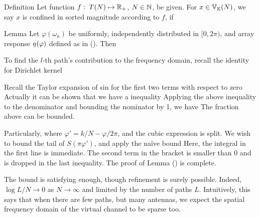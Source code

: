 \Result
{Definition}
{
Let function \(f:\; T (N) \mapsto \mathbb{R}_+\), \(N \in \mathbb{N}\), be given.
For \(x \in \mathbb{V}_{\mathbb{K}}(N)\), we say \(x\) is confined in sorted magnitude according to \(f\), if
}

\Result
{Lemma}
{
Let \(\varphi (\omega_h)\) be uniformly, independently distributed in \([0,2\pi)\), and array response \(\V{a} (\varphi)\) defined as in ().
Then
%
%
}

To find the \(l\)-th path's contribution to the frequency domain, recall the identity for Dirichlet kernel
%
%

Recall the Taylor expansion of sin for the first two terms with respect to zero
%
%
Actually it can be shown that we have a inequality
%
%
Applying the above inequality to the denominator and bounding the nominator by 1, we have
%
%
The fraction above can be bounded.

Particularly,
%
%
where \(\varphi' =k/N -\varphi/2\pi\), and the cubic expression is split.
We wish to bound the tail of \(S (\pi \varphi')\), and apply the na\"ive bound
%
%
Here, the integral in the first line is immediate.
The second term in the bracket is smaller than 0 and is dropped in the last inequality.
The proof of Lemma () is complete.

The bound is satisfying enough, though refinement is surely possible.
Indeed, \(\log L/N \to 0\) as \(N \to \infty\) and limited by the number of paths \(L\).
Intuitively, this says that when there are few paths, but many antennas, we expect the spatial frequency domain of the virtual channel to be sparse too.


